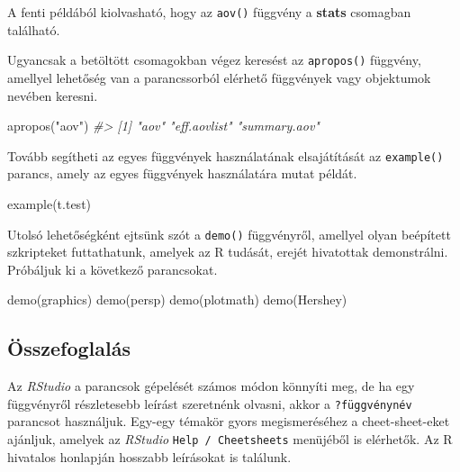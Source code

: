 \documentclass[
]{book}
\makeatletter
\newenvironment{Shaded}{\begin{snugshade}}{\end{snugshade}}
\newcommand{\CommentTok}[1]{\textcolor[rgb]{0.56,0.35,0.01}{\textit{#1}}}
\newcommand{\FunctionTok}[1]{\textcolor[rgb]{0.00,0.00,0.00}{#1}}
\newcommand{\NormalTok}[1]{#1}
\newcommand{\StringTok}[1]{\textcolor[rgb]{0.31,0.60,0.02}{#1}}
\newenvironment{kframe}{%
\medskip{}
\setlength{\fboxsep}{.8em}
 \def\at@end@of@kframe{}%
 \ifinner\ifhmode%
  \def\at@end@of@kframe{\end{minipage}}%
  \begin{minipage}{\columnwidth}%
 \fi\fi%
 \def\FrameCommand##1{\hskip\@totalleftmargin \hskip-\fboxsep
 \colorbox{shadecolor}{##1}\hskip-\fboxsep
     \hskip-\linewidth \hskip-\@totalleftmargin \hskip\columnwidth}%
 \MakeFramed {\advance\hsize-\width
   \@totalleftmargin\z@ \linewidth\hsize
   \@setminipage}}%
 {\par\unskip\endMakeFramed%
 \at@end@of@kframe}
\newenvironment{rmdblock}[1]
  {
  \begin{itemize}
  \renewcommand{\labelitemi}{
    \raisebox{-.7\height}[0pt][0pt]{
      {\setkeys{Gin}{width=3em,keepaspectratio}\texttt{[image: images/\#1]}}
    }
  }
  \setlength{\fboxsep}{1em}
  \begin{kframe}
  \item
  }
  {
  \end{kframe}
  \end{itemize}
  }
\newenvironment{rmdsummary}
  {\begin{rmdblock}{summary}}
  {\end{rmdblock}}
\makeatother
\begin{document}
A fenti példából kiolvasható, hogy az \texttt{aov()} függvény a \textbf{stats} csomagban található.

Ugyancsak a betöltött csomagokban végez keresést az \texttt{apropos()} függvény, amellyel lehetőség van a parancssorból elérhető függvények vagy objektumok nevében keresni.

\begin{Shaded}
\begin{Highlighting}[]
\FunctionTok{apropos}\NormalTok{(}\StringTok{"aov"}\NormalTok{)}
\CommentTok{\#\textgreater{} [1] "aov"         "eff.aovlist" "summary.aov"}
\end{Highlighting}
\end{Shaded}

Tovább segítheti az egyes függvények használatának elsajátítását az \texttt{example()} parancs, amely az egyes függvények használatára mutat példát.

\begin{Shaded}
\begin{Highlighting}[]
\FunctionTok{example}\NormalTok{(t.test)}
\end{Highlighting}
\end{Shaded}

Utolsó lehetőségként ejtsünk szót a \texttt{demo()} függvényről, amellyel olyan beépített szkripteket futtathatunk, amelyek az R tudását, erejét hivatottak demonstrálni. Próbáljuk ki a következő parancsokat.

\begin{Shaded}
\begin{Highlighting}[]
\FunctionTok{demo}\NormalTok{(graphics)}
\FunctionTok{demo}\NormalTok{(persp)}
\FunctionTok{demo}\NormalTok{(plotmath)}
\FunctionTok{demo}\NormalTok{(Hershey)}
\end{Highlighting}
\end{Shaded}

\hypertarget{munka-az-r-ben-2-summary}{%
\subsection{Összefoglalás}\label{munka-az-r-ben-2-summary}}

\begin{rmdsummary}
Az \emph{RStudio} a parancsok gépelését számos módon könnyíti meg, de ha
egy függvényről részletesebb leírást szeretnénk olvasni, akkor a
\texttt{?függvénynév} parancsot használjuk. Egy-egy témakör gyors
megismeréséhez a cheet-sheet-eket ajánljuk, amelyek az \emph{RStudio}
\texttt{Help\ /\ Cheetsheets} menüjéből is elérhetők. Az R hivatalos
honlapján hosszabb leírásokat is találunk.
\end{rmdsummary}
\end{document}
